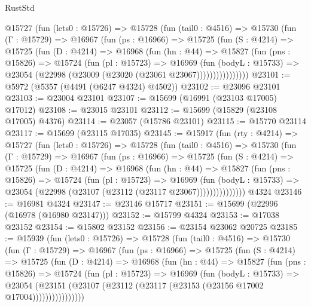 \begin{lexlean}{RustStd}
\begin{coremodule}
      @15727
        (fun (lets0 : @15726) =>
        @15728
          (fun (tail0 : @4516) =>
          @15730
            (fun (Γ : @15729) =>
            @16967
              (fun (ps : @16966) =>
              @15725
                (fun (S : @4214) =>
                @15725
                  (fun (D : @4214) =>
                  @16968
                    (fun (hn : @44) =>
                    @15827
                      (fun (pns : @15826) =>
                      @15724
                        (fun (pl : @15723) =>
                        @16969
                          (fun (bodyL : @15733) =>
                          @23054 (@22998 (@23009 (@23020 (@23061 @23067))))))))))))))))
@23101 := @5972 (@5357 (@4491 (@6247 @4324) @4502))
@23102 := @23096 @23101
@23103 := @23004 @23101
@23107 := @15699 (@16991 (@23103 @17005) @17012)
@23108 := @23015 @23101
@23112 := @15699 (@15829 (@23108 @17005) @4376)
@23114 := @23057 (@15786 @23101)
@23115 := @15770 @23114
@23117 := @15699 (@23115 @17035)
@23145 := @15917
    (fun (rty : @4214) =>
    @15727
      (fun (lets0 : @15726) =>
      @15728
        (fun (tail0 : @4516) =>
        @15730
          (fun (Γ : @15729) =>
          @16967
            (fun (ps : @16966) =>
            @15725
              (fun (S : @4214) =>
              @15725
                (fun (D : @4214) =>
                @16968
                  (fun (hn : @44) =>
                  @15827
                    (fun (pns : @15826) =>
                    @15724
                      (fun (pl : @15723) =>
                      @16969
                        (fun (bodyL : @15733) =>
                        @23054 (@22998 (@23107 (@23112 (@23117 @23067)))))))))))))))
    @4324
@23146 := @16981 @4324
@23147 := @23146 @15717
@23151 := @15699 (@22996 (@16978 (@16980 @23147)))
@23152 := @15799 @4324
@23153 := @17038 @23152
@23154 := @15802 @23152
@23156 := @23154 @23062 @20725
@23185 := @15939
    (fun (lets0 : @15726) =>
    @15728
      (fun (tail0 : @4516) =>
      @15730
        (fun (Γ : @15729) =>
        @16967
          (fun (ps : @16966) =>
          @15725
            (fun (S : @4214) =>
            @15725
              (fun (D : @4214) =>
              @16968
                (fun (hn : @44) =>
                @15827
                  (fun (pns : @15826) =>
                  @15724
                    (fun (pl : @15723) =>
                    @16969
                      (fun (bodyL : @15733) =>
                      @23054
                        (@23151
                          (@23107 (@23112 (@23117 (@23153 (@23156 @17002 @17004))))))))))))))))

\end{coremodule}
\end{lexlean}
